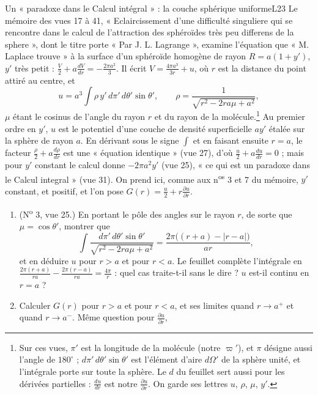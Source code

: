 \documentclass[11pt,a4paper]{article}
\begin{document}
\begin{exercice}{Un « paradoxe dans le Calcul intégral » : la couche sphérique uniforme}{L2}{3}
Le mémoire des vues 17 à 41, « Eclaircissement d'une difficulté singuliere qui se
rencontre dans le calcul de l'attraction des sphéroïdes très peu differens de la
sphere », dont le titre porte « Par J. L. Lagrange », examine l'équation que
« M. Laplace trouve » à la surface d'un sphéroïde homogène de rayon
$R = a(1+y')$, $y'$ très petit : $\frac V2 + a\frac{dV}{dr} = -\frac{2\pi a^2}{3}$.
Il écrit $V = \frac{4\pi a^3}{3r} + u$, où $r$ est la distance du point attiré au
centre, et
\[
u = a^3\int \rho\,y'\,d\pi'\,d\theta'\sin\theta', \qquad
\rho = \frac{1}{\sqrt{r^2 - 2ra\mu + a^2}},
\]
$\mu$ étant le cosinus de l'angle du rayon $r$ et du rayon de la
molécule.\footnote{Sur ces vues, $\pi'$ est la longitude de la molécule (notre
$\varpi'$), et $\pi$ désigne aussi l'angle de $180^\circ$ ; $d\pi'\,d\theta'\sin\theta'$
est l'élément d'aire $d\Omega'$ de la sphère unité, et l'intégrale porte sur toute
la sphère. Le $d$ du feuillet sert aussi pour les dérivées partielles :
$\frac{du}{dr}$ est notre $\frac{\partial u}{\partial r}$. On garde ses lettres $u$,
$\rho$, $\mu$, $y'$.} Au premier ordre en $y'$, $u$ est le potentiel d'une couche de
densité superficielle $ay'$ étalée sur la sphère de rayon $a$. En dérivant sous le
signe $\int$ et en faisant ensuite $r = a$, le facteur
$\frac\rho2 + a\frac{d\rho}{dr}$ est une « équation identique » (vue 27), d'où
$\frac u2 + a\frac{du}{dr} = 0$ ; mais pour $y'$ constant le calcul donne
$-2\pi a^2y'$ (vue 25), « ce qui est un paradoxe dans le Calcul integral »
(vue 31). On prend ici, comme aux n\textsuperscript{os} 3 et 7 du mémoire, $y'$
constant, et positif, et l'on pose $G(r) = \frac u2 + r\frac{\partial u}{\partial r}$.
\begin{enumerate}
\item (N\textsuperscript{o} 3, vue 25.) En portant le pôle des angles sur le rayon
  $r$, de sorte que $\mu = \cos\theta'$, montrer que
  \[
  \int\frac{d\pi'\,d\theta'\sin\theta'}{\sqrt{r^2 - 2ra\mu + a^2}}
  = \frac{2\pi\bigl((r+a) - |r-a|\bigr)}{ar},
  \]
  et en déduire $u$ pour $r > a$ et pour $r < a$. Le feuillet complète l'intégrale en
  $\frac{2\pi(r+a)}{ra} - \frac{2\pi(r-a)}{ra} = \frac{4\pi}{r}$ : quel cas
  traite-t-il sans le dire ? $u$ est-il continu en $r = a$ ?
\item Calculer $G(r)$ pour $r > a$ et pour $r < a$, et ses limites quand
  $r \to a^+$ et quand $r \to a^-$. Même question pour $\frac{\partial u}{\partial r}$,

\end{enumerate}
\end{exercice}
\end{document}
